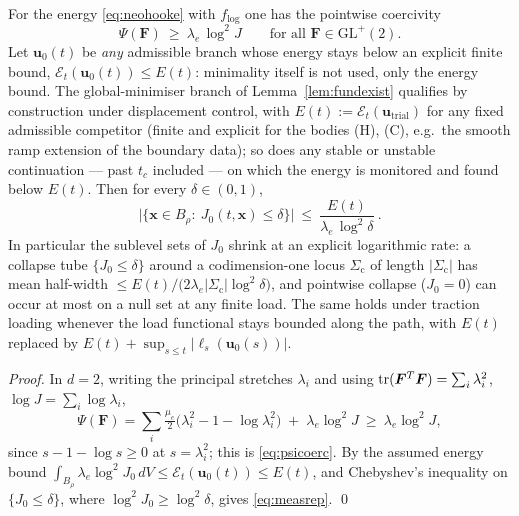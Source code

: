 \begin{lemma}
    \label{lem:measrep}
    For the energy \eqref{eq:neohooke} with $f_{\log}$ one has the pointwise coercivity
    \begin{equation}
        \label{eq:psicoerc}
        \Psi(\bm F)\ \ge\ \lambda_e\,\log^2 J \qquad \text{for all } \bm F\in\mathrm{GL}^+(2).
    \end{equation}
    Let $\bm u_0(t)$ be \emph{any} admissible branch whose energy stays below an explicit finite bound,
    $\mathcal E_t(\bm u_0(t))\le E(t)$: minimality itself is not used, only the energy bound. The global-minimiser
    branch of Lemma~\ref{lem:fundexist} qualifies by construction under displacement control, with
    $E(t):=\mathcal E_t(\bm u_{\mathrm{trial}})$ for any fixed admissible competitor (finite and explicit for the
    bodies (H), (C), e.g.\ the smooth ramp extension of the boundary data); so does any stable or unstable
    continuation --- past $t_c$ included --- on which the energy is monitored and found below $E(t)$. Then for
    every $\delta\in(0,1)$,
    \begin{equation}
        \label{eq:measrep}
        \big|\{\bm x\in B_\rho:\ J_0(t,\bm x)\le\delta\}\big|\ \le\ \frac{E(t)}{\lambda_e\,\log^2\delta}\ .
    \end{equation}
    In particular the sublevel sets of $J_0$ shrink at an explicit logarithmic rate: a collapse tube
    $\{J_0\le\delta\}$ around a codimension-one locus $\Sigma_{\mathrm{c}}$ of length $|\Sigma_{\mathrm{c}}|$ has mean
    half-width $\le E(t)/\big(2\lambda_e|\Sigma_{\mathrm{c}}|\log^2\delta\big)$, and pointwise collapse ($J_0=0$) can
    occur at most on a null set at any finite load. The same holds under traction loading whenever the load
    functional stays bounded along the path, with $E(t)$ replaced by
    $E(t)+\sup_{s\le t}|\ell_s(\bm u_0(s))|$.
\end{lemma}

\begin{proof}
    In $d=2$, writing the principal stretches $\lambda_i$ and using $\operatorname{tr}(\bm F^T\bm F)=\sum_i\lambda_i^2$,
    $\log J=\sum_i\log\lambda_i$,
    \begin{equation*}
        \Psi(\bm F)=\sum_{i}\tfrac{\mu_e}{2}\big(\lambda_i^2-1-\log\lambda_i^2\big)\;+\;\lambda_e\log^2 J
        \ \ge\ \lambda_e\log^2 J,
    \end{equation*}
    since $s-1-\log s\ge0$ at $s=\lambda_i^2$; this is \eqref{eq:psicoerc}. By the assumed energy bound
    $\int_{B_\rho}\lambda_e\log^2J_0\,dV\le\mathcal E_t(\bm u_0(t))\le E(t)$, and Chebyshev's inequality on
    $\{J_0\le\delta\}$, where $\log^2J_0\ge\log^2\delta$, gives \eqref{eq:measrep}. \qed
\end{proof}

